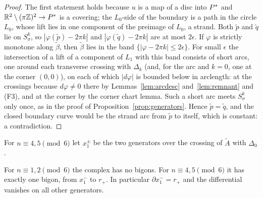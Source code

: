 \begin{proof}
The first statement holds because $u$ is a map of a disc into $P^{*}$ and $\mathbb{R}^2\setminus(\pi\mathbb{Z})^2\to P^{*}$ is a covering;
the $L_0$-side of the boundary is a path in the circle $L_0$, whose lift lies in one component of the preimage of
$L_0$, a strand. Both $\tilde p$ and $\tilde q$ lie on $S^k_\sigma$, so $|\varphi(\tilde p)-2\pi k|$ and $|\varphi(\tilde q)-2\pi k|$ are at most
$2\epsilon$. If $\varphi$ is strictly monotone along $\tilde\beta$, then $\tilde\beta$ lies in the band $\{|\varphi-2\pi k|\le2\epsilon\}$. For
small $\epsilon$ the intersection of a lift of a component of $L_1$ with this band consists of short arcs, one
around each transverse crossing with $\Delta_k$ (and, for the arc and $k=0$, one at the corner $(0,0)$), on each
of which $|d\varphi|$ is bounded below in arclength: at the crossings because $d\varphi\neq0$ there by
Lemmas~\ref{lem:arcdesc} and~\ref{lem:remnant} and (F3), and at the corner by the corner chart lemma. Such a
short arc meets $S^k_\sigma$ only once, as in the proof of Proposition~\ref{prop:generators}. Hence $\tilde p=\tilde q$,
and the closed boundary curve would be the strand arc from $\tilde p$ to itself, which is constant: a
contradiction.
\end{proof}

For $n\equiv4,5\pmod 6$ let $x_1^\pm$ be the two generators over the crossing of $\tilde A$ with $\Delta_0$.

\begin{proposition}\label{prop:bigons}
For $n\equiv1,2\pmod6$ the complex has no bigons. For $n\equiv4,5\pmod6$ it has exactly one bigon, from $x_1^-$
to $r_+$. In particular $\partial x_1^-=r_+$ and the differential vanishes on all other generators.
\end{proposition}

